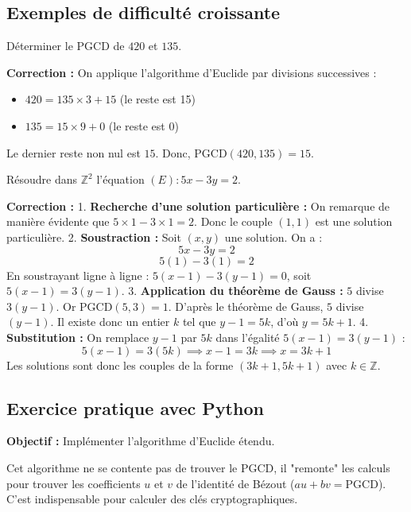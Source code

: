 \subsection{Exemples de difficulté croissante}

\begin{exemple}
Déterminer le PGCD de $420$ et $135$.
\end{exemple}

\textbf{Correction :} On applique l'algorithme d'Euclide par divisions successives :
\begin{itemize}
    \item $420 = 135 \times 3 + 15$ (le reste est 15)
    \item $135 = 15 \times 9 + 0$ (le reste est 0)
\end{itemize}
Le dernier reste non nul est $15$. Donc, $\text{PGCD}(420, 135) = 15$.

\begin{exemple}
Résoudre dans $\mathbb{Z}^2$ l'équation $(E) : 5x - 3y = 2$.
\end{exemple}

\textbf{Correction :} 
1. \textbf{Recherche d'une solution particulière :} On remarque de manière évidente que $5 \times 1 - 3 \times 1 = 2$. Donc le couple $(1, 1)$ est une solution particulière.
2. \textbf{Soustraction :} Soit $(x, y)$ une solution. On a :
$$5x - 3y = 2$$
$$5(1) - 3(1) = 2$$
En soustrayant ligne à ligne : $5(x - 1) - 3(y - 1) = 0$, soit $5(x - 1) = 3(y - 1)$.
3. \textbf{Application du théorème de Gauss :} $5$ divise $3(y - 1)$. Or $\text{PGCD}(5, 3) = 1$. D'après le théorème de Gauss, $5$ divise $(y - 1)$.
Il existe donc un entier $k$ tel que $y - 1 = 5k$, d'où $y = 5k + 1$.
4. \textbf{Substitution :} On remplace $y - 1$ par $5k$ dans l'égalité $5(x - 1) = 3(y - 1)$ :
$$5(x - 1) = 3(5k) \implies x - 1 = 3k \implies x = 3k + 1$$
Les solutions sont donc les couples de la forme $(3k + 1, 5k + 1)$ avec $k \in \mathbb{Z}$.

\subsection{Exercice pratique avec Python}

\textbf{Objectif :} Implémenter l'algorithme d'Euclide étendu. 

Cet algorithme ne se contente pas de trouver le PGCD, il "remonte" les calculs pour trouver les coefficients $u$ et $v$ de l'identité de Bézout ($au + bv = \text{PGCD}$). C'est indispensable pour calculer des clés cryptographiques.

